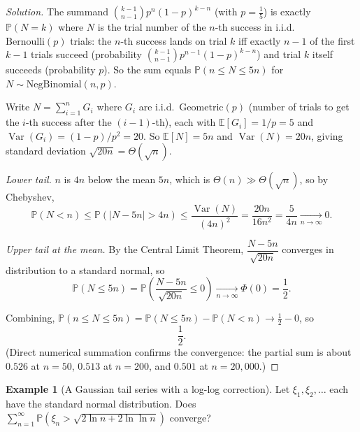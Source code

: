 \documentclass[11pt]{article}
\theoremstyle{definition}
\newtheorem{example}{Example}[section]
\newcommand{\E}{\mathbb{E}}
\newcommand{\Var}{\operatorname{Var}}
\begin{document}
\begin{proof}[Solution]
The summand $\binom{k-1}{n-1}p^n(1-p)^{k-n}$ (with $p=\tfrac15$) is exactly $\mathbb{P}(N=k)$ where $N$ is the trial number of the $n$-th success in i.i.d.\ $\mathrm{Bernoulli}(p)$ trials: the $n$-th success lands on trial $k$ iff exactly $n-1$ of the first $k-1$ trials succeed (probability $\binom{k-1}{n-1}p^{n-1}(1-p)^{k-n}$) and trial $k$ itself succeeds (probability $p$). So the sum equals $\mathbb{P}(n\le N\le 5n)$ for $N\sim\mathrm{NegBinomial}(n,p)$.

Write $N=\sum_{i=1}^n G_i$ where $G_i$ are i.i.d.\ $\mathrm{Geometric}(p)$ (number of trials to get the $i$-th success after the $(i-1)$-th), each with $\E[G_i]=1/p=5$ and $\Var(G_i)=(1-p)/p^2=20$. So $\E[N]=5n$ and $\Var(N)=20n$, giving standard deviation $\sqrt{20n}=\Theta(\sqrt n)$.

\emph{Lower tail.} $n$ is $4n$ below the mean $5n$, which is $\Theta(n)\gg\Theta(\sqrt n)$, so by Chebyshev,
\[
\mathbb{P}(N<n)\le\mathbb{P}(|N-5n|>4n)\le\frac{\Var(N)}{(4n)^2}=\frac{20n}{16n^2}=\frac{5}{4n}\xrightarrow[n\to\infty]{}0.
\]

\emph{Upper tail at the mean.} By the Central Limit Theorem, $\dfrac{N-5n}{\sqrt{20n}}$ converges in distribution to a standard normal, so
\[
\mathbb{P}(N\le5n)=\mathbb{P}\!\left(\frac{N-5n}{\sqrt{20n}}\le0\right)\xrightarrow[n\to\infty]{}\Phi(0)=\frac12.
\]

Combining, $\mathbb{P}(n\le N\le5n)=\mathbb{P}(N\le5n)-\mathbb{P}(N<n)\to\tfrac12-0$, so
\[
\boxed{\frac12}.
\]
(Direct numerical summation confirms the convergence: the partial sum is about $0.526$ at $n=50$, $0.513$ at $n=200$, and $0.501$ at $n=20{,}000$.)
\end{proof}

\begin{example}[A Gaussian tail series with a log-log correction]
Let $\xi_1,\xi_2,\dots$ each have the standard normal distribution. Does $\displaystyle\sum_{n=1}^\infty \mathbb P\!\left(\xi_n>\sqrt{2\ln n+2\ln\ln n}\right)$ converge?
\end{example}
\end{document}
